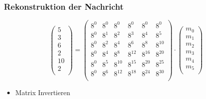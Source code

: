 \documentclass[11pt,aspectratio=169]{beamer}
\begin{document}
	\begin{frame}
		\frametitle{Rekonstruktion der Nachricht}
		
		\[
		\begin{pmatrix}
			5 \\ 3 \\ 6 \\ 2 \\ 10 \\ 2 \\
		\end{pmatrix}
		=
		\begin{pmatrix}
			8^0&    8^0&    8^0&    8^0&    8^0&    8^0\\
			8^0&	8^1&	8^2&	8^3&	8^4&	8^5\\
			8^0&	8^2&	8^4&	8^6&	8^8& 8^{10}\\
			8^0&	8^4&	8^8& 8^{12}& 8^{16}& 8^{20}\\
			8^0&	8^5& 8^{10}& 8^{15}& 8^{20}& 8^{25}\\
			8^0&	8^6& 8^{12}& 8^{18}& 8^{24}& 8^{30}\\
		\end{pmatrix}
		\cdot
		\begin{pmatrix}
			m_0 \\ m_1 \\ m_2 \\ m_3 \\ m_4 \\ m_5 \\
		\end{pmatrix}
		\]
		
		\vspace{5pt}
		
		\begin{itemize}
			\item Matrix Invertieren
		\end{itemize}
		
	\end{frame}
\end{document}
